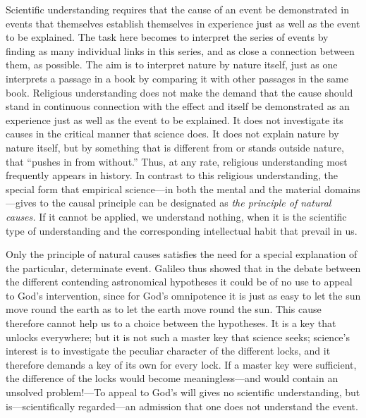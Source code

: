 \documentclass[12pt,a4paper]{book}
\newcommand{\opage}[1]{\marginnote{\footnotesize\textit{[#1]}}}
\begin{document}
Scientific understanding requires that the cause of an event be
demonstrated in events that themselves establish themselves in
experience just as well as the event to be explained. The task here
becomes to interpret the series of events by finding as many individual
links in this series, and as close a connection between them, as
possible. The aim is to interpret nature by nature itself, just as one
interprets a passage in a book by comparing it with other passages in
the same book. Religious understanding does not make the demand that the
cause should stand in continuous connection with the effect and itself
be demonstrated as an experience just as well as the event to be
explained. It does not investigate its causes in the critical manner
that science does. It does not explain nature by nature itself, but by
something that is different from or stands outside nature, that
``pushes in from without.'' Thus, at any rate, religious understanding
most frequently appears in history.
In contrast to this religious understanding, the special form that
empirical science---in both the mental and the material domains---gives
to the causal principle can be designated as \emph{the principle of
natural causes.} If it cannot be applied, we understand nothing, when it
is the 
\opage{19}scientific type of understanding and the corresponding
intellectual habit that prevail in us.

Only the principle of natural causes satisfies the need for a special
explanation of the particular, determinate event. Galileo thus showed
that in the debate between the different contending astronomical
hypotheses it could be of no use to appeal to God's intervention, since
for God's omnipotence it is just as easy to let the sun move round the
earth as to let the earth move round the sun. This cause therefore
cannot help us to a choice between the hypotheses. It is a key that
unlocks everywhere; but it is not such a master key that science seeks;
science's interest is to investigate the peculiar character of the
different locks, and it therefore demands a key of its own for every
lock. If a master key were sufficient, the difference of the locks would
become meaningless---and would contain an unsolved problem!---To appeal
to God's will gives no scientific understanding, but is---scientifically
regarded---an admission that one does not understand the event.
\end{document}
